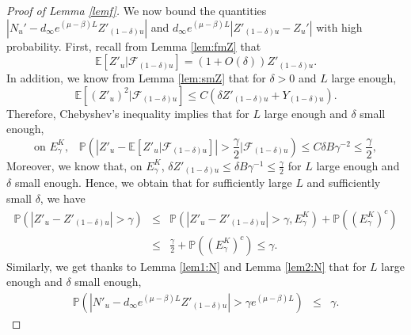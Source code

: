 \documentclass[11pt]{article}
\theoremstyle{plain}
\begin{document}
\begin{proof}[Proof of Lemma \ref{lemf}]

We now bound the quantities $|N_u'-d_\infty e^{(\mu-\beta)L}Z'_{(1-\delta )u}|$ and $d_\infty e^{(\mu-\beta)L}|Z'_{(1-\delta )u}-Z_{u}'|$ with high probability. First, recall from Lemma \ref{lem:fmZ} that
\begin{equation*}
\mathbb{E}\left[Z'_{u}|\mathcal{F}_{(1-\delta)u}\right]= (1+O(\delta))Z'_{(1-\delta)u}.
\end{equation*}
In addition, we know from  Lemma \ref{lem:smZ} that for $\delta>0$ and $L$ large enough,
\begin{equation*}
\mathbb{E}\left[\left(Z'_{u}\right)^2|\mathcal{F}_{(1-\delta)u}\right]\leqslant C\left(\delta Z'_{(1-\delta)u}+Y_{(1-\delta)u}\right).\end{equation*}
Therefore,  Chebyshev's inequality  implies that for $L$ large enough and $\delta$ small enough, 
\begin{equation*}
\text{on $E_\gamma^K$,} \quad 
\mathbb{P}\left( \left|Z'_{u}-\mathbb{E}\left[Z'_{u}\big|\mathcal{F}_{(1-\delta)u}\right]\right|>\frac{\gamma}{2}\big|\mathcal{F}_{(1-\delta)u}\right)\leqslant C\delta B\gamma^{-2}\leqslant \frac{\gamma}{2},
\end{equation*}
Moreover, we know that, on $E_\gamma^K$, $\delta Z'_{(1-\delta)u}\leqslant \delta B\gamma^{-1}\leqslant  \frac{\gamma}{2}$  for $L$ large enough and $\delta$ small enough. Hence, we obtain that for sufficiently large $L$ and sufficiently small $\delta$, we have
\begin{eqnarray}
\mathbb{P}\left( \left|Z'_{u}-Z'_{(1-\delta)u}\right|>\gamma\right)&\leqslant&\mathbb{P}\left(\left|Z'_{u}-Z'_{(1-\delta)u}\right|>\gamma ,E_\gamma^K\right)+\mathbb{P}((E^K_\gamma)^c)\nonumber \\
&\leqslant& \frac{\gamma}{2}+\mathbb{P}((E^K_\gamma)^c)\leqslant \gamma. \label{eq:condE} \end{eqnarray}
Similarly, we get thanks to Lemma \ref{lem1:N} and Lemma \ref{lem2:N} that for $L$ large enough and $\delta$ small enough,
\begin{eqnarray}\label{condEN}
\mathbb{P}\left( \left|N'_{u}-d_\infty e^{(\mu-\beta)L}Z'_{(1-\delta)u}\right|>\gamma e^{(\mu-\beta)L}\right)&\leqslant&\gamma.\end{eqnarray}


\end{proof}
\end{document}
